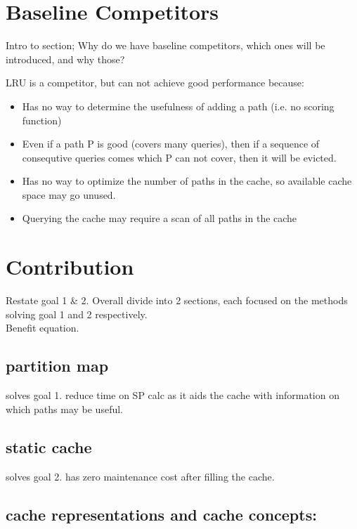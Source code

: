 \section{Baseline Competitors}

Intro to section; Why do we have baseline competitors, which ones will be introduced, and why those? 

LRU is a competitor, but can not achieve good performance because:
\begin{itemize}	
	\item Has no way to determine the usefulness of adding a path (i.e. no scoring function)
	\item Even if a path P is good (covers many queries), then if a sequence of consequtive queries comes which P can not cover, then it will be evicted.
	\item Has no way to optimize the number of paths in the cache, so available cache space may go unused.
	\item Querying the cache may require a scan of all paths in the cache
\end{itemize}

\section{Contribution} \label{sec:contribution}

Restate goal 1 \& 2. Overall divide into 2 sections, each focused on the methods solving goal 1 and 2 respectively. \\

Benefit equation.\\

\subsection{partition map} 
solves goal 1. reduce time on SP calc as it aids the cache with information on which paths may be useful.\\ 


\subsection{static cache} 
solves goal 2. has zero maintenance cost after filling the cache.


\subsection{cache representations and cache concepts:} 

